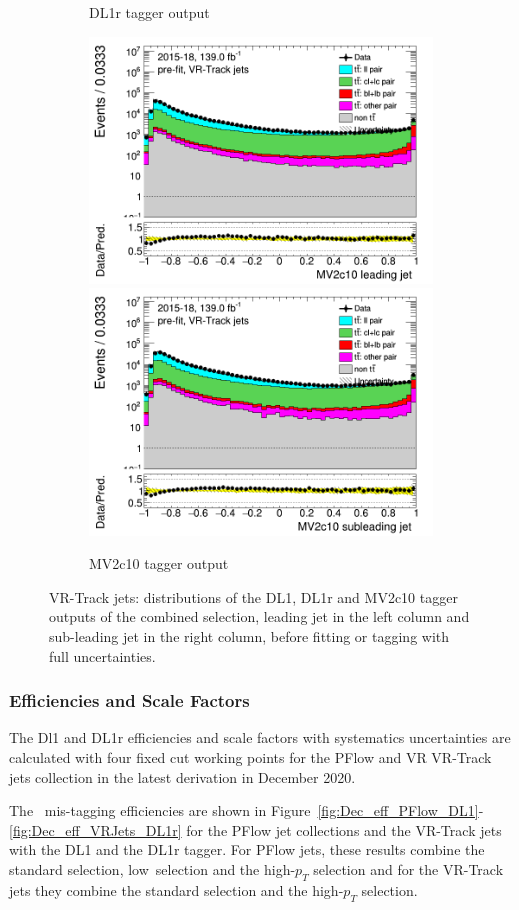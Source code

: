 \documentclass[letterpaper,12pt]{article}
\begin{document}
\begin{figure}[H]
\begin{subfigure}[t]{1\linewidth}
	\caption{DL1r tagger output}
	\end{subfigure}
	\begin{subfigure}[t]{1\linewidth}
	\includegraphics[width=.45\textwidth]{FTAG_plots/pretagNoRwwithhighpTVRJetsall/DataMC_h_J0_MV2c10_Fulltrackjet_log.png}
	\includegraphics[width=.45\textwidth]{FTAG_plots/pretagNoRwwithhighpTVRJetsall/DataMC_h_J1_MV2c10_Fulltrackjet_log.png}\\
	\caption{MV2c10 tagger output}
	\end{subfigure}
	\caption{VR-Track jets: distributions of the DL1, DL1r and MV2c10 tagger outputs of 
	the combined selection, 
	leading jet in the left column and sub-leading jet in the right column,
	before fitting or tagging with full uncertainties.} \label{fig:taggers_VRJets}
\end{figure}	

\subsubsection{Efficiencies and Scale Factors}

The Dl1 and DL1r \cjet efficiencies and scale factors with systematics 
uncertainties are calculated with four fixed cut working points 
for the PFlow and VR VR-Track jets collection in the latest derivation 
in December 2020.

The \cjet\ mis-tagging efficiencies are shown in Figure~\ref{fig:Dec_eff_PFlow_DL1}-\ref{fig:Dec_eff_VRJets_DL1r} 
for the PFlow jet collections and the VR-Track jets with the DL1 and the DL1r tagger. 
For PFlow jets, these results combine the standard selection, low\pt\ selection and the high-$p_T$ selection 
and for the VR-Track jets they combine the standard selection and the high-$p_T$ selection. 
\end{document}
